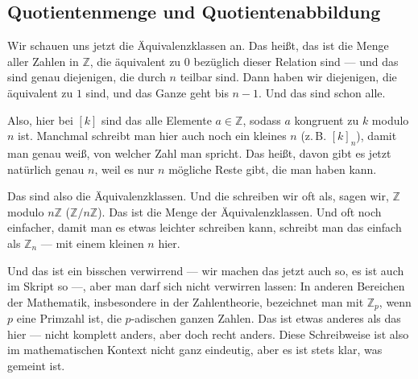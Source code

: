 \subsection{Quotientenmenge und Quotientenabbildung}

\begin{spoken-clean}[00:03:17 - 00:05:31]
Wir schauen uns jetzt die Äquivalenzklassen an. Das heißt, das ist die Menge aller Zahlen in $\mathbb{Z}$, die äquivalent zu $0$ bezüglich dieser Relation sind --- und das sind genau diejenigen, die durch $n$ teilbar sind. Dann haben wir diejenigen, die äquivalent zu $1$ sind, und das Ganze geht bis $n - 1$. Und das sind schon alle.

Also, hier bei $[k]$ sind das alle Elemente $a \in \mathbb{Z}$, sodass $a$ kongruent zu $k$ modulo $n$ ist. Manchmal schreibt man hier auch noch ein kleines $n$ (z.\,B. $[k]_n$), damit man genau weiß, von welcher Zahl man spricht. Das heißt, davon gibt es jetzt natürlich genau $n$, weil es nur $n$ mögliche Reste gibt, die man haben kann.

Das sind also die Äquivalenzklassen. Und die schreiben wir oft als, sagen wir, $\mathbb{Z}$ modulo $n\mathbb{Z}$ ($\mathbb{Z}/n\mathbb{Z}$). Das ist die Menge der Äquivalenzklassen. Und oft noch einfacher, damit man es etwas leichter schreiben kann, schreibt man das einfach als $\mathbb{Z}_n$ --- mit einem kleinen $n$ hier.

Und das ist ein bisschen verwirrend --- wir machen das jetzt auch so, es ist auch im Skript so ---, aber man darf sich nicht verwirren lassen: In anderen Bereichen der Mathematik, insbesondere in der Zahlentheorie, bezeichnet man mit $\mathbb{Z}_p$, wenn $p$ eine Primzahl ist, die $p$-adischen ganzen Zahlen. Das ist etwas anderes als das hier --- nicht komplett anders, aber doch recht anders. Diese Schreibweise ist also im mathematischen Kontext nicht ganz eindeutig, aber es ist stets klar, was gemeint ist.
\end{spoken-clean}

